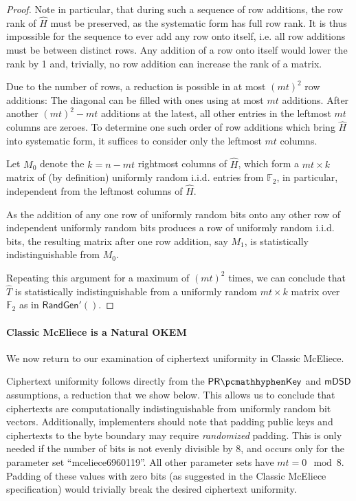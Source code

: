 \begin{proof}
    Note in particular, that during such a sequence of row additions, the row rank of $\hat H$ must be preserved, as the systematic form has full row rank. It is thus impossible for the sequence to ever add any row onto itself, i.e. all row additions must be between distinct rows. Any addition of a row onto itself would lower the rank by 1 and, trivially, no row addition can increase the rank of a matrix.
    
    Due to the number of rows, a reduction is possible in at most $(mt)^2$ row additions: The diagonal can be filled with ones using at most $mt$ additions. After another $(mt)^2-mt$ additions at the latest, all other entries in the leftmost $mt$ columns are zeroes. To determine one such order of row additions which bring $\hat H$ into systematic form, it suffices to consider only the leftmost $mt$ columns.
    
    Let $M_0$ denote the $k = n - mt$ rightmost columns of $\hat H$, which form a $mt \times k$ matrix of (by definition) uniformly random i.i.d. entries from $\mathbb F_2$, in particular, independent from the leftmost columns of $\hat H$.
    
    As the addition of any one row of uniformly random bits onto any other row of independent uniformly random bits produces a row of uniformly random i.i.d. bits, the resulting matrix after one row addition, say $M_1$, is statistically indistinguishable from $M_0$.
    
    Repeating this argument for a maximum of $(mt)^2$ times, we can conclude that $\hat T$ is statistically indistinguishable from a uniformly random $mt \times k$ matrix over $\mathbb F_2$ as in $\mathsf{RandGen}'()$.
\end{proof}

\paragraph{Classic McEliece is a Natural OKEM}
We now return to our examination of ciphertext uniformity in Classic McEliece.

Ciphertext uniformity follows directly from the $\prkey$ and $\mathsf{mDSD}$ assumptions, a reduction that we show below. This allows us to conclude that ciphertexts are computationally indistinguishable from uniformly random bit vectors. Additionally, implementers should note that padding public keys and ciphertexts to the byte boundary may require \emph{randomized} padding. This is only needed if the number of bits is not evenly divisible by 8, and occurs only for the parameter set ``mceliece6960119''. All other parameter sets have $mt = 0 \mod 8$. Padding of these values with zero bits (as suggested in the Classic McEliece specification) would trivially break the desired ciphertext uniformity.

